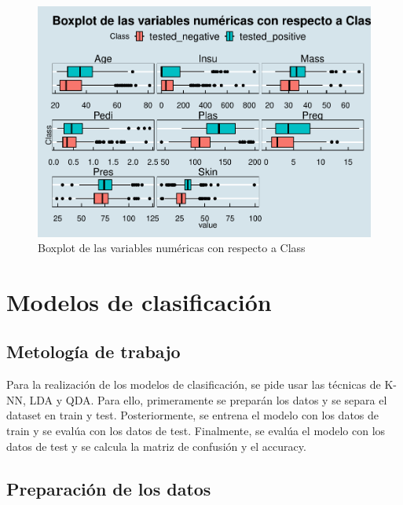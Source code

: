 \documentclass[
]{article}
\begin{document}
\begin{figure}

{\centering \includegraphics[width=1\linewidth]{pima-clasificacion_files/figure-latex/multi_boxplot-1} 

}

\caption{Boxplot de las variables numéricas con respecto a Class}\label{fig:multi_boxplot}
\end{figure}

\hypertarget{modelos-de-clasificaciuxf3n}{%
\section{Modelos de clasificación}\label{modelos-de-clasificaciuxf3n}}

\hypertarget{metologuxeda-de-trabajo}{%
\subsection{Metología de trabajo}\label{metologuxeda-de-trabajo}}

Para la realización de los modelos de clasificación, se pide usar las
técnicas de K-NN, LDA y QDA. Para ello, primeramente se preparán los
datos y se separa el dataset en train y test. Posteriormente, se entrena
el modelo con los datos de train y se evalúa con los datos de test.
Finalmente, se evalúa el modelo con los datos de test y se calcula la
matriz de confusión y el accuracy.

\hypertarget{preparaciuxf3n-de-los-datos}{%
\subsection{Preparación de los
datos}\label{preparaciuxf3n-de-los-datos}}
\end{document}
